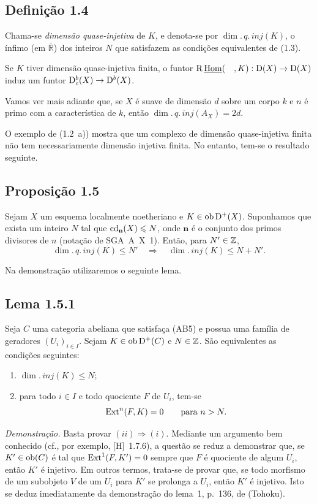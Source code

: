 \subsection*{Definição 1.4}
Chama-se \emph{dimensão quase-injetiva} de $K$, e denota-se por $\dim.\,q.\,inj(K)$, o ínfimo (em $\overline{\mathbb R}$) dos inteiros $N$ que satisfazem as condições equivalentes de (1.3).

Se $K$ tiver dimensão quase-injetiva finita, o funtor $\mathrm{R}\,\underline{\operatorname{Hom}}(\quad,K) : \mathrm{D}(X) \to \mathrm{D}(X)$ induz um funtor $\mathrm{D}_c^{b}(X) \to \mathrm{D}^{b}(X)$.

Vamos ver mais adiante que, se $X$ é suave de dimensão $d$ sobre um corpo $k$ e $n$ é primo com a característica de $k$, então $\dim.\,q.\,inj(A_X) = 2d$.

O exemplo de (1.2~a)) mostra que um complexo de dimensão quase-injetiva finita não tem necessariamente dimensão injetiva finita. No entanto, tem-se o resultado seguinte.

\subsection*{Proposição 1.5}
Sejam $X$ um esquema localmente noetheriano e $K \in \operatorname{ob} \mathrm{D}^{+}(X)$. Suponhamos que exista um inteiro $N$ tal que $\operatorname{cd}_{\mathbf{n}}(X) \leqslant N$, onde $\mathbf{n}$ é o conjunto dos primos divisores de $n$ (notação de SGA~A~X~1). Então, para $N' \in \mathbb{Z}$,
\[
\dim.\,q.\,inj(K) \leqslant N' \quad \Longrightarrow \quad \dim.\,inj(K) \leqslant N + N'.
\]

Na demonstração utilizaremos o seguinte lema.

\subsection*{Lema 1.5.1}
Seja $C$ uma categoria abeliana que satisfaça (AB5) e possua uma família de geradores $(U_i)_{i \in I}$. Sejam $K \in \operatorname{ob} \mathrm{D}^{+}(C)$ e $N \in \mathbb{Z}$. São equivalentes as condições seguintes:
\begin{enumerate}[label=(\roman*)]
\item $\dim.\,inj(K) \leqslant N$;
\item para todo $i \in I$ e todo quociente $F$ de $U_i$, tem-se
\[
\operatorname{Ext}^n(F,K) = 0 \qquad \text{para } n > N.
\]
\end{enumerate}

\emph{Demonstração.} Basta provar $(ii) \Rightarrow (i)$. Mediante um argumento bem conhecido (cf., por exemplo, [H]~1.7.6), a questão se reduz a demonstrar que, se $K' \in \operatorname{ob}(C)$ é tal que $\operatorname{Ext}^1(F,K') = 0$ sempre que $F$ é quociente de algum $U_i$, então $K'$ é injetivo. Em outros termos, trata-se de provar que, se todo morfismo de um subobjeto $V$ de um $U_i$ para $K'$ se prolonga a $U_i$, então $K'$ é injetivo. Isto se deduz imediatamente da demonstração do lema~1, p.~136, de (Tohoku).

